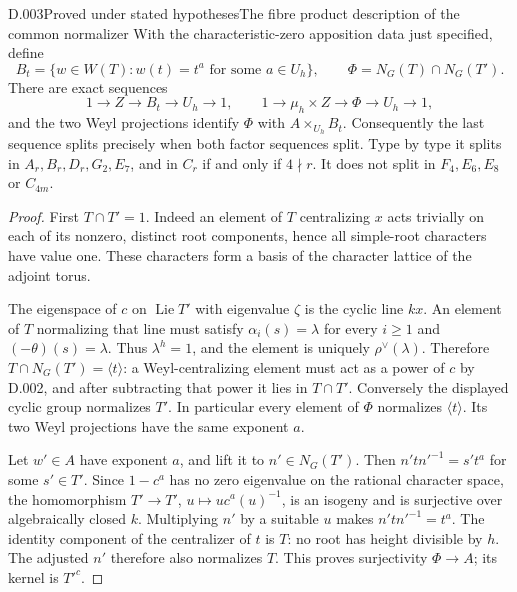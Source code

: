 \begin{saresult}{D.003}{Proved under stated hypotheses}{The fibre product description of the common normalizer}
With the characteristic-zero apposition data just specified, define
\[
 B_t=\{w\in W(T):w(t)=t^a\text{ for some }a\in U_h\},
 \qquad\Phi=N_G(T)\cap N_G(T').
\]
There are exact sequences
\[
1\to Z\to B_t\to U_h\to1,\qquad
1\to\mu_h\times Z\to\Phi\to U_h\to1,
\]
and the two Weyl projections identify $\Phi$ with
$A\times_{U_h}B_t$.  Consequently the last sequence splits precisely
when both factor sequences split.  Type by type it splits in
$A_r,B_r,D_r,G_2,E_7$, and in $C_r$ if and only if $4\nmid r$.
It does not split in $F_4,E_6,E_8$ or $C_{4m}$.
\end{saresult}
\begin{proof}
First $T\cap T'=1$.  Indeed an element of $T$ centralizing $x$ acts
trivially on each of its nonzero, distinct root components, hence all
simple-root characters have value one.  These characters form a basis
of the character lattice of the adjoint torus.

The eigenspace of $c$ on $\operatorname{Lie}T'$ with eigenvalue $\zeta$
is the cyclic line $kx$.  An element of $T$ normalizing that line must
satisfy $\alpha_i(s)=\lambda$ for every $i\ge1$ and
$(-\theta)(s)=\lambda$.  Thus $\lambda^h=1$, and the element is
uniquely $\rho^\vee(\lambda)$.  Therefore
$T\cap N_G(T')=\langle t\rangle$: a Weyl-centralizing element must
act as a power of $c$ by D.002, and after subtracting that power it lies
in $T\cap T'$.  Conversely the displayed cyclic group normalizes $T'$.
In particular every element of $\Phi$ normalizes $\langle t\rangle$.
Its two Weyl projections have the same exponent $a$.

Let $w'\in A$ have exponent $a$, and lift it to $n'\in N_G(T')$.
Then $n'tn'^{-1}=s't^a$ for some $s'\in T'$.  Since $1-c^a$ has no
zero eigenvalue on the rational character space, the homomorphism
$T'\to T'$, $u\mapsto u c^a(u)^{-1}$, is an isogeny and is
surjective over algebraically closed $k$.  Multiplying $n'$ by a
suitable $u$ makes $n'tn'^{-1}=t^a$.  The identity component of the
centralizer of $t$ is $T$: no root has height divisible by $h$.
The adjusted $n'$ therefore also normalizes $T$.  This proves
surjectivity $\Phi\to A$; its kernel is $T'^c$.


\end{proof}
